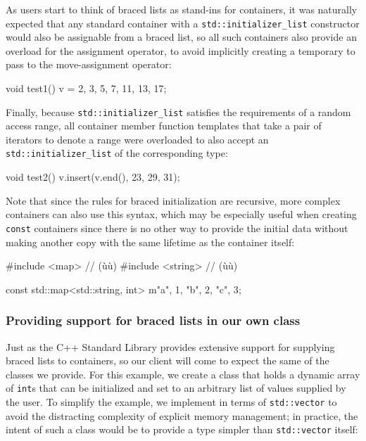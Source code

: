 As users start to think of braced lists as stand-ins for containers, it
was naturally expected that any standard container with a
\lstinline!std::initializer_list! constructor would also be assignable
from a braced list, so all such containers also provide an overload for
the assignment operator, to avoid implicitly creating a temporary to
pass to the move-assignment operator:

\begin{emcppslisting}[emcppsbatch=e5]
void test1()
{
    v = {2, 3, 5, 7, 11, 13, 17};
}
\end{emcppslisting}
    

\noindent Finally, because \lstinline!std::initializer_list! satisfies the
requirements of a random access range, all container member function
templates that take a pair of iterators to denote a range were
overloaded to also accept an \lstinline!std::initializer_list! of the
corresponding type:

\begin{emcppslisting}[emcppsbatch=e5]
void test2()
{
    v.insert(v.end(), {23, 29, 31});
}
\end{emcppslisting}
    

\noindent Note that since the rules for braced initialization are recursive, more
complex containers can also use this syntax, which may be especially
useful when creating \lstinline!const! containers since there is no other
way to provide the initial data without making another copy with the
same lifetime as the container itself:

\begin{emcppslisting}
#include <map>     // (ù{}ù)
#include <string>  // (ù{}ù)

const std::map<std::string, int> m{{"a", 1}, {"b", 2}, {"c", 3}};
\end{emcppslisting}
    

\subsubsection[Providing support for braced lists in our own class]{Providing support for braced lists in our own class}\label{providing-support-for-braced-lists-in-our-own-class}

Just as the C++ Standard Library provides extensive support for
supplying braced lists to containers, so our client will come to expect
the same of the classes we provide. For this example, we create a class
that holds a dynamic array of \lstinline!int!s that can be initialized and
set to an arbitrary list of values supplied by the user. To simplify the
example, we implement in terms of \lstinline!std::vector! to avoid the
distracting complexity of explicit memory management; in practice, the
intent of such a class would be to provide a type simpler than
\lstinline!std::vector! itself:

